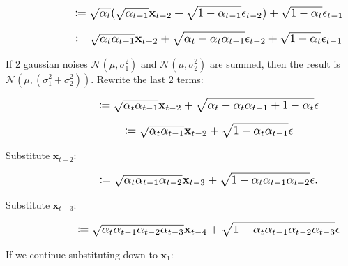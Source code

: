 \documentclass{article}
\newcommand*{\Scale}[2][4]{\scalebox{#1}{\ensuremath{#2}}}
\begin{document}
\begin{equation}
\Scale[1.2]{ \displaystyle
\hspace{4.75em} \coloneq \sqrt{\alpha_t} (\sqrt{\alpha_{t-1}} \textbf{x}_{t-2} + \sqrt{1-\alpha_{t-1}} \epsilon_{t-2}) + \sqrt{1-\alpha_t}\epsilon_{t-1} }
\end{equation}

\begin{equation}
\Scale[1.2]{ \displaystyle
\hspace{4.75em} \coloneq \sqrt{\alpha_t \alpha_{t-1}} \textbf{x}_{t-2} + \sqrt{\alpha_t - \alpha_t\alpha_{t-1}} \epsilon_{t-2} + \sqrt{1-\alpha_t}\epsilon_{t-1} }
\end{equation}

If 2 gaussian noises $ \mathscr{N}(\mu,\sigma_1^2) $ and $ \mathscr{N}(\mu,\sigma_2^2) $ are summed, then the result is $ \mathscr{N}(\mu,(\sigma_1^2 + \sigma_2^2)) $. Rewrite the last 2 terms:

\begin{equation}
\Scale[1.2]{ \displaystyle
\hspace{4.75em} \coloneq \sqrt{\alpha_t \alpha_{t-1}} \textbf{x}_{t-2} + \sqrt{\alpha_t - \alpha_t\alpha_{t-1} + 1-\alpha_t} \epsilon }
\end{equation}

\begin{equation}
\Scale[1.2]{ \displaystyle
\hspace{4.75em} \coloneq \sqrt{\alpha_t \alpha_{t-1}} \textbf{x}_{t-2} + \sqrt{1-\alpha_t\alpha_{t-1}} \epsilon }
\end{equation}

Substitute $ \textbf{x}_{t-2} $:

\begin{equation}
\Scale[1.2]{ \displaystyle
\hspace{4.75em} \coloneq \sqrt{\alpha_t \alpha_{t-1} \alpha_{t-2}} \textbf{x}_{t-3} + \sqrt{1-\alpha_t\alpha_{t-1}\alpha_{t-2}} \epsilon. }
\end{equation}

Substitute $ \textbf{x}_{t-3} $:

\begin{equation}
\Scale[1.2]{ \displaystyle
\hspace{4.75em} \coloneq \sqrt{\alpha_t \alpha_{t-1} \alpha_{t-2} \alpha_{t-3}} \textbf{x}_{t-4} + \sqrt{1-\alpha_t\alpha_{t-1}\alpha_{t-2}\alpha_{t-3}} \epsilon }
\end{equation}

If we continue substituting down to $ \textbf{x}_{1} $:
\end{document}
